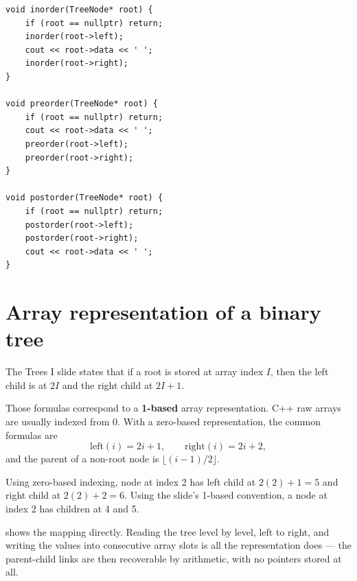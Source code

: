 \begin{lstlisting}
void inorder(TreeNode* root) {
    if (root == nullptr) return;
    inorder(root->left);
    cout << root->data << ' ';
    inorder(root->right);
}

void preorder(TreeNode* root) {
    if (root == nullptr) return;
    cout << root->data << ' ';
    preorder(root->left);
    preorder(root->right);
}

void postorder(TreeNode* root) {
    if (root == nullptr) return;
    postorder(root->left);
    postorder(root->right);
    cout << root->data << ' ';
}
\end{lstlisting}

\section{Array representation of a binary tree}

The Trees I slide states that if a root is stored at array index $I$, then the left child is at $2I$ and the right child at $2I+1$.

\begin{clarification}
Those formulas correspond to a \textbf{1-based} array representation. C++ raw arrays are usually indexed from 0. With a zero-based representation, the common formulas are
\[
\text{left}(i)=2i+1,\qquad \text{right}(i)=2i+2,
\]
and the parent of a non-root node is $\lfloor(i-1)/2\rfloor$.
\end{clarification}

\begin{workedexample}
Using zero-based indexing, node at index 2 has left child at $2(2)+1=5$ and right child at $2(2)+2=6$. Using the slide's 1-based convention, a node at index 2 has children at 4 and 5.
\end{workedexample}

 shows the mapping directly. Reading the tree level by level, left to
right, and writing the values into consecutive array slots is all the representation does ---
the parent-child links are then recoverable by arithmetic, with no pointers stored at all.

